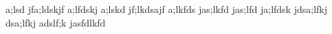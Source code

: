 a;lsd jfa;ldskjf a;lfdskj a;lskd jf;lkdsajf
a;lkfds jas;lkfd jas;lfd ja;lfdsk jdsa;lfkj
dsa;lfkj adslf;k jasfdlkfd
